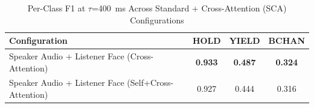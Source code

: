 \begin{table}[h]
\caption{Per-Class F1 at $\tau$=400~ms Across Standard + Cross-Attention (SCA) Configurations}
\label{tab:f1_per_class_sca}
\small
\renewcommand{\arraystretch}{1.20}
\begin{tabular}{>{\raggedright\arraybackslash}p{4cm}ccc}
\toprule
Configuration & HOLD & YIELD & BCHAN \\
\midrule
Speaker Audio + Listener Face (Cross-Attention) & \textbf{0.933} & \textbf{0.487} & \textbf{0.324} \\
Speaker Audio + Listener Face (Self+Cross-Attention) & 0.927 & 0.444 & 0.316 \\
\bottomrule
\end{tabular}
\end{table}
